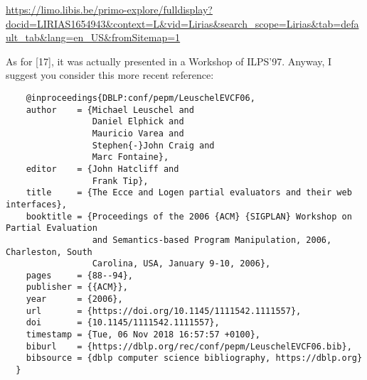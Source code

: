 \begin{itemize}
  \url{https://limo.libis.be/primo-explore/fulldisplay?docid=LIRIAS1654943&context=L&vid=Lirias&search_scope=Lirias&tab=default_tab&lang=en_US&fromSitemap=1}

  As for [17], it was actually presented in a Workshop of ILPS'97.
  Anyway, I suggest you consider this more recent reference:

  \begin{verbatim}
    @inproceedings{DBLP:conf/pepm/LeuschelEVCF06,
    author    = {Michael Leuschel and
                 Daniel Elphick and
                 Mauricio Varea and
                 Stephen{-}John Craig and
                 Marc Fontaine},
    editor    = {John Hatcliff and
                 Frank Tip},
    title     = {The Ecce and Logen partial evaluators and their web interfaces},
    booktitle = {Proceedings of the 2006 {ACM} {SIGPLAN} Workshop on Partial Evaluation
                 and Semantics-based Program Manipulation, 2006, Charleston, South
                 Carolina, USA, January 9-10, 2006},
    pages     = {88--94},
    publisher = {{ACM}},
    year      = {2006},
    url       = {https://doi.org/10.1145/1111542.1111557},
    doi       = {10.1145/1111542.1111557},
    timestamp = {Tue, 06 Nov 2018 16:57:57 +0100},
    biburl    = {https://dblp.org/rec/conf/pepm/LeuschelEVCF06.bib},
    bibsource = {dblp computer science bibliography, https://dblp.org}
  }
  \end{verbatim}

\end{itemize}